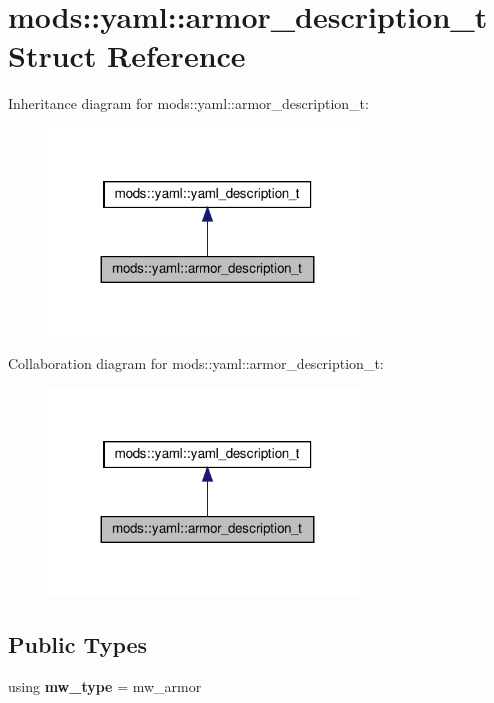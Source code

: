 \hypertarget{structmods_1_1yaml_1_1armor__description__t}{}\section{mods\+:\+:yaml\+:\+:armor\+\_\+description\+\_\+t Struct Reference}
\label{structmods_1_1yaml_1_1armor__description__t}


Inheritance diagram for mods\+:\+:yaml\+:\+:armor\+\_\+description\+\_\+t\+:
\nopagebreak
\begin{figure}[H]
\begin{center}
\leavevmode
\includegraphics[width=239pt]{structmods_1_1yaml_1_1armor__description__t__inherit__graph}
\end{center}
\end{figure}


Collaboration diagram for mods\+:\+:yaml\+:\+:armor\+\_\+description\+\_\+t\+:
\nopagebreak
\begin{figure}[H]
\begin{center}
\leavevmode
\includegraphics[width=239pt]{structmods_1_1yaml_1_1armor__description__t__coll__graph}
\end{center}
\end{figure}
\subsection*{Public Types}
\begin{DoxyCompactItemize}
\item 
\mbox{\label{structmods_1_1yaml_1_1armor__description__t_acfcf487bdb00185df9e9235d62d9a01c}} 
using {\bfseries mw\+\_\+type} = mw\+\_\+armor
\end{DoxyCompactItemize}
